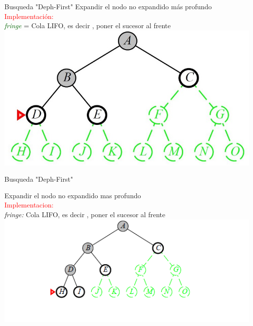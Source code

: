 \documentclass{beamer}
\theoremstyle{definition}
\theoremstyle{theorem}
\theoremstyle{remark}
\begin{document}
\begin{frame}{Busqueda "Deph-First"}
    Expandir el nodo no expandido más profundo
    \\
    \textcolor{Red}{\large{Implementación:}}
    \\
    \qquad\qquad\textcolor{DarkGreen}{\textit{fringe}} = Cola LIFO, es decir , poner el sucesor al frente
    \\
    \centering
    \includegraphics[scale=.5]{43_tree.JPG} 
\end{frame}

\begin{frame}{Busqueda "Deph-First"}
        
    Expandir el nodo no expandido mas profundo
    \\\textcolor{red}{\large{Implementacion:}}
    \\\qquad\qquad\textit{fringe:} Cola LIFO, es decir , poner el sucesor al frente
    \\
    \centering
    \includegraphics[scale=0.5]{47_image_cap3pag47.PNG}
        
\end{frame}

\end{document}
